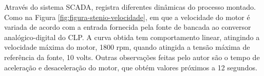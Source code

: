         \begin{figure}[!h]
    	\end{figure}
    
    	
Através do sistema \gls{SCADA},  registra diferentes dinâmicas do processo montado. Como na Figura \ref{fig:figura-stenio-velocidade}, em que a velocidade do motor é variada de acordo com a entrada fornecida pela fonte de bancada ao conversor analógico-digital do \gls{CLP}. A curva obtida tem comportamento linear, atingindo a velocidade máxima do motor,  1800 rpm, quando atingida a tensão máxima de referência da fonte, 10 volts. Outras observações feitas pelo autor são o tempo de aceleração e desaceleração do motor, que obtém valores próximos a 12 segundos.


